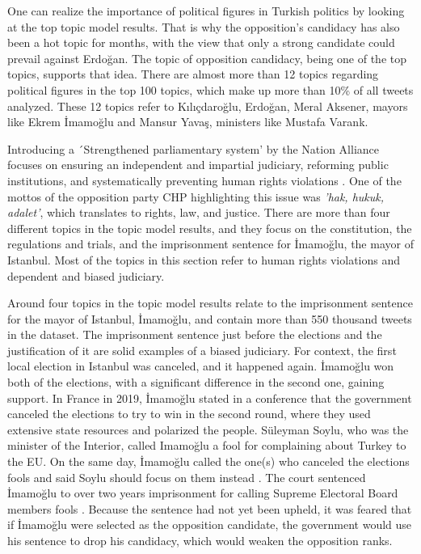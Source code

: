 One can realize the importance of political figures in Turkish politics by looking at the top topic 
model results. That is why the opposition's candidacy has also been a hot topic for months, with the 
view that only a strong candidate could prevail against Erdoğan. The topic of opposition candidacy, 
being one of the top topics, supports that idea. There are almost more than 12 topics regarding political 
figures in the top 100 topics, which make up more than 10\% of all tweets analyzed. These 12 topics refer 
to Kılıçdaroğlu, Erdoğan, Meral Aksener, mayors like Ekrem İmamoğlu and Mansur Yavaş, 
ministers like Mustafa Varank.

Introducing a ´Strengthened parliamentary system' by the Nation Alliance focuses on ensuring an independent 
and impartial judiciary, reforming public institutions, and systematically preventing human rights 
violations \parencite{edgar_sar_opposition_election_agenda_2023}. One of the mottos of the opposition 
party CHP highlighting this issue was \textit{'hak, hukuk, adalet'}, which translates to rights, law, and 
justice. There are more than four different topics in the topic model results, and they focus on the 
constitution, the regulations and trials, and the imprisonment sentence for İmamoğlu, the mayor of Istanbul. 
Most of the topics in this section refer to human rights violations and dependent and biased judiciary. 

Around four topics in the topic model results relate to the imprisonment sentence for the mayor of 
Istanbul, İmamoğlu, and contain more than 550 thousand tweets in the dataset. The imprisonment sentence 
just before the elections and the justification of it are solid examples of a biased judiciary. For context, 
the first local election in Istanbul was canceled, and it happened again. İmamoğlu won both of the 
elections, with a significant difference in the second one, gaining support. In France in 2019, 
İmamoğlu stated in a conference that the government canceled the elections to try to win in the second 
round, where they used extensive state resources and polarized the people. Süleyman Soylu, who was the 
minister of the Interior, called Imamoğlu a fool for complaining about Turkey to the EU. 
On the same day, İmamoğlu called the one(s) who canceled the elections fools and said Soylu should focus 
on them instead \parencite{bbc_imamoglu_dava_2022}. The court sentenced İmamoğlu to over two years 
imprisonment for calling Supreme Elec­toral Board members fools \parencite{aktürk_imamoglu_dava_2022}. 
Because the sentence had not yet been upheld, it was feared that if İmamoğlu were selected as the 
opposition candidate, the government would use his sentence to drop his candidacy, which would weaken 
the opposition ranks.

